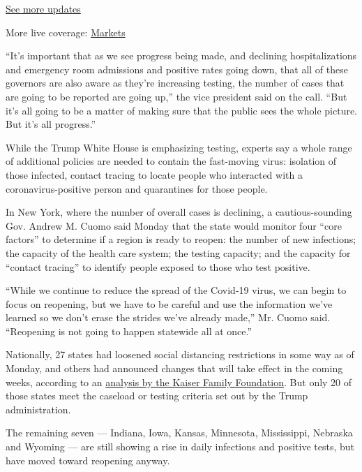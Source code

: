 \href{https://www.nytimes3xbfgragh.onion/2020/08/04/world/coronavirus-cases.html?action=click\&pgtype=Article\&state=default\&region=MAIN_CONTENT_1\&context=storylines_live_updates}{See
more updates}

More live coverage:
\href{https://www.nytimes3xbfgragh.onion/live/2020/08/04/business/stock-market-today-coronavirus?action=click\&pgtype=Article\&state=default\&region=MAIN_CONTENT_1\&context=storylines_live_updates}{Markets}

``It's important that as we see progress being made, and declining
hospitalizations and emergency room admissions and positive rates going
down, that all of these governors are also aware as they're increasing
testing, the number of cases that are going to be reported are going
up,'' the vice president said on the call. ``But it's all going to be a
matter of making sure that the public sees the whole picture. But it's
all progress.''

While the Trump White House is emphasizing testing, experts say a whole
range of additional policies are needed to contain the fast-moving
virus: isolation of those infected, contact tracing to locate people who
interacted with a coronavirus-positive person and quarantines for those
people.

In New York, where the number of overall cases is declining, a
cautious-sounding Gov. Andrew M. Cuomo said Monday that the state would
monitor four ``core factors'' to determine if a region is ready to
reopen: the number of new infections; the capacity of the health care
system; the testing capacity; and the capacity for ``contact tracing''
to identify people exposed to those who test positive.

``While we continue to reduce the spread of the Covid-19 virus, we can
begin to focus on reopening, but we have to be careful and use the
information we've learned so we don't erase the strides we've already
made,'' Mr. Cuomo said. ``Reopening is not going to happen statewide all
at once.''

Nationally, 27 states had loosened social distancing restrictions in
some way as of Monday, and others had announced changes that will take
effect in the coming weeks, according to an
\href{https://www.kff.org/coronavirus-policy-watch/lifting-social-distancing-measures-in-america-state-actions-metrics/}{analysis
by the Kaiser Family Foundation}. But only 20 of those states meet the
caseload or testing criteria set out by the Trump administration.

The remaining seven --- Indiana, Iowa, Kansas, Minnesota, Mississippi,
Nebraska and Wyoming --- are still showing a rise in daily infections
and positive tests, but have moved toward reopening anyway.

